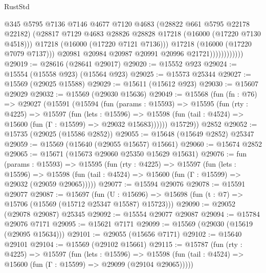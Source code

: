 \begin{lexlean}{RustStd}
\begin{coremodule}
                                @345
                                @5795
                                @7136
                                @7146
                                @4677
                                @7120
                                @4683
                                (@28822 @661 @5795 @22178 @22182)
                                (@28817
                                  @7129
                                  @4683
                                  @28826
                                  @28828
                                  @17218
                                  (@16000 (@17220 @7130 @4518)))
                                @17218
                                (@16000 (@17220 @7121 @7136)))
                              @17218
                              (@16000 (@17220 @7079 @7137)))
                            @20981
                            @20984
                            @20987
                            @20991
                            @20996
                            @21721))))))))))))
@29019 := @28616 (@28641 @29017)
@29020 := @15552 @923
@29024 := @15554 (@15558 @923) (@15564 @923)
@29025 := @15573 @25344
@29027 := @15569 (@29025 @15588)
@29029 := @15611 (@15612 @923)
@29030 := @15607 @29029
@29032 := @15569 (@29030 @15636)
@29049 := @15568
    (fun (fn : @76) =>
    @29027
      (@15591
        (@15594
          (fun (params : @15593) =>
          @15595
            (fun (rty : @4225) =>
            @15597
              (fun (lets : @15596) =>
              @15598 (fun (tail : @4524) => @15600 (fun (Γ : @15599) => @29032 @15683))))))
        @15729))
    @2852
@29052 := @15735 (@29025 (@15586 @2852))
@29055 := @15648 (@15649 @2852) @25347
@29059 := @15569 (@15640 (@29055 @15657) @15661)
@29060 := @15674 @2852
@29065 := @15671 (@15673 @29060 @25350 @15629 @15631)
@29076 := fun (params : @15593) =>
  @15595
    (fun (rty : @4225) =>
    @15597
      (fun (lets : @15596) =>
      @15598 (fun (tail : @4524) => @15600 (fun (Γ : @15599) => @29032 (@29059 @29065)))))
@29077 := @15594 @29076
@29078 := @15591 @29077
@29087 := @15697
    (fun (U : @15696) => @15698 (fun (t : @7) => @15706 (@15569 (@15712 @25347 @15587) @15723)))
@29090 := @29052 (@29078 @29087) @25345
@29092 := @15554 @29077 @29087
@29094 := @15784 @29076 @7171
@29095 := @15621 @7171
@29099 := @15569 (@29030 (@15619 (@29095 @15634)))
@29101 := @29055 (@15656 @7171)
@29102 := @15640 @29101
@29104 := @15569 (@29102 @15661)
@29115 := @15787
    (fun (rty : @4225) =>
    @15597
      (fun (lets : @15596) =>
      @15598 (fun (tail : @4524) => @15600 (fun (Γ : @15599) => @29099 (@29104 @29065)))))

\end{coremodule}
\end{lexlean}
